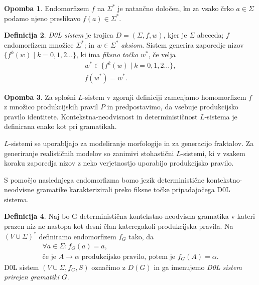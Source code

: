 \documentclass{amsart}
\theoremstyle{definition}
\newtheorem{definicija}{Definicija}[section]
\newtheorem{opomba}[definicija]{Opomba}
\theoremstyle{plain} %
\begin{document}
\begin{opomba}
    
    Endomorfizem $ f $ na $ \Sigma^* $ je natančno določen, ko za vsako črko $ a \in \Sigma $ podamo njeno preslikavo $ f(a) \in \Sigma^* $.

\end{opomba}

\begin{definicija}
    
    \textit{D0L sistem} je trojica $ D = (\Sigma, f, w) $, kjer je $ \Sigma $ abeceda; $ f $ endomorfizem množice $ \Sigma^* $;
    in $ w \in \Sigma^* $ \textit{aksiom}. Sistem generira zaporedje nizov $ \{ f^k(w) \mid k = 0, 1,2 \ldots \} $, 
    ki ima \textit{fiksno točko $ w^* $}, če velja
    \begin{gather*}
        w^* \in \{ f^k(w) \mid k = 0, 1,2 \ldots \}, \\
        f(w^*)= w^*.
    \end{gather*}


\end{definicija}

\begin{opomba}
    
    Za splošni $ L $-sistem v zgornji definiciji zamenjamo homomorfizem $ f $ z množico produkcijskih pravil $ P $ in predpostavimo,
    da vsebuje produkcijsko pravilo identitete. Kontekstna-neodvisnost in determinističnost $ L $-sistema je definirana enako kot pri gramatikah. 
    
    $ L $-sistemi se uporabljajo za modeliranje morfologije in za generacijo fraktalov. Za generiranje realističnih modelov
    so zanimivi stohastični $ L $-sistemi, ki v vsakem koraku zaporedja nizov z neko verjetnostjo uporabijo produkcijsko pravilo.

\end{opomba}

S pomočjo naslednjega endomorfizma bomo jezik deterministične kontekstno-neodvisne gramatike karakterizirali preko fiksne točke pripadajočega 
D0L sistema.

\begin{definicija}
    
    Naj bo G deterministična kontekstno-neodvisna gramatika v kateri prazen niz ne nastopa kot desni član kateregakoli
    produkcijska pravila. Na $ (V \cup \Sigma)^* $ definiramo endomorfizem $ f_G $ tako, da 
    \begin{gather*}
        \forall a \in \Sigma \colon f_G(a) = a, \\
        \text{če je } A \rightarrow \alpha \text{ produkcijsko pravilo, potem je } f_G(A) = \alpha.
    \end{gather*}
    D0L sistem $ (V \cup \Sigma, f_G, S) $ označimo z $ D(G) $ in ga imenujemo \textit{D0L sistem prirejen gramatiki $G$}.

\end{definicija}
\end{document}
